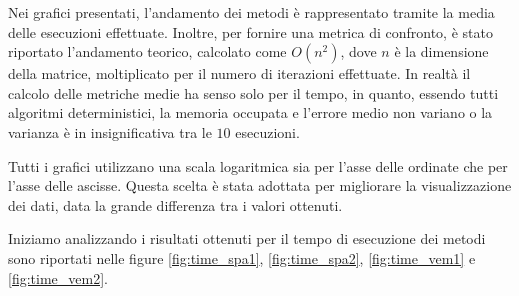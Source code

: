 Nei grafici presentati, l'andamento dei metodi è rappresentato tramite la media
delle esecuzioni effettuate. Inoltre, per fornire una metrica di confronto, è
stato riportato l'andamento teorico, calcolato come $O(n^2)$, dove $n$ è la
dimensione della matrice, moltiplicato per il numero di iterazioni effettuate.
In realtà il calcolo delle metriche medie ha senso solo per il 
tempo, in quanto, essendo tutti algoritmi deterministici, la memoria occupata e 
l'errore medio non variano o la varianza è in insignificativa tra le $10$ esecuzioni.

Tutti i grafici utilizzano una scala logaritmica sia per l'asse delle ordinate
che per l'asse delle ascisse. Questa scelta è stata adottata per migliorare la
visualizzazione dei dati, data la grande differenza tra i valori ottenuti.

Iniziamo analizzando i risultati ottenuti per il tempo di esecuzione dei metodi
sono riportati nelle figure \ref{fig:time_spa1}, \ref{fig:time_spa2}, \ref{fig:time_vem1}
e \ref{fig:time_vem2}.

